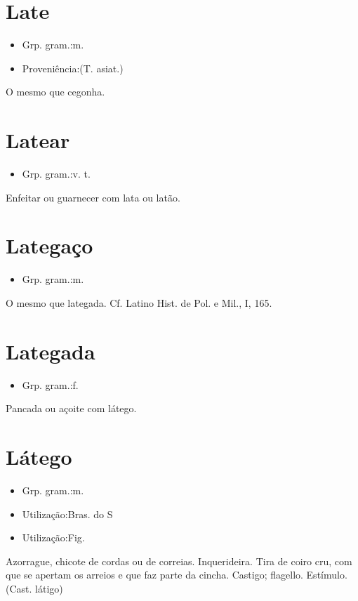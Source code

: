 \section{Late}
\begin{itemize}
\item {Grp. gram.:m.}
\end{itemize}
\begin{itemize}
\item {Proveniência:(T. asiat.)}
\end{itemize}
O mesmo que \textunderscore cegonha\textunderscore .
\section{Latear}
\begin{itemize}
\item {Grp. gram.:v. t.}
\end{itemize}
Enfeitar ou guarnecer com lata ou latão.
\section{Lategaço}
\begin{itemize}
\item {Grp. gram.:m.}
\end{itemize}
O mesmo que \textunderscore lategada\textunderscore . Cf. Latino \textunderscore Hist. de Pol. e Mil.\textunderscore , I, 165.
\section{Lategada}
\begin{itemize}
\item {Grp. gram.:f.}
\end{itemize}
Pancada ou açoite com látego.
\section{Látego}
\begin{itemize}
\item {Grp. gram.:m.}
\end{itemize}
\begin{itemize}
\item {Utilização:Bras. do S}
\end{itemize}
\begin{itemize}
\item {Utilização:Fig.}
\end{itemize}
Azorrague, chicote de cordas ou de correias.
Inquerideira.
Tira de coiro cru, com que se apertam os arreios e que faz parte da cincha.
Castigo; flagello.
Estímulo.
(Cast. \textunderscore látigo\textunderscore )
